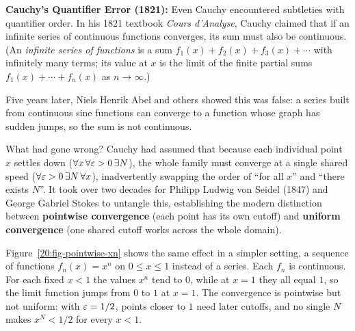 \begin{trapbox}
\textbf{Cauchy's Quantifier Error (1821):}
Even Cauchy encountered subtleties with quantifier order. In his 1821 textbook \emph{Cours d'Analyse}, Cauchy claimed that if an infinite series of continuous functions converges, its sum must also be continuous. (An \emph{infinite series of functions} is a sum $f_1(x) + f_2(x) + f_3(x) + \cdots$ with infinitely many terms; its value at $x$ is the limit of the finite partial sums $f_1(x) + \cdots + f_n(x)$ as $n \to \infty$.)

Five years later, Niels Henrik Abel and others showed this was false: a series built from continuous sine functions can converge to a function whose graph has sudden jumps, so the sum is not continuous.

What had gone wrong? Cauchy had assumed that because each individual point $x$ settles down ($\forall x \, \forall \varepsilon > 0 \, \exists N$), the whole family must converge at a single shared speed ($\forall \varepsilon > 0 \, \exists N \, \forall x$), inadvertently swapping the order of ``for all $x$'' and ``there exists $N$''. It took over two decades for Philipp Ludwig von Seidel (1847) and George Gabriel Stokes to untangle this, establishing the modern distinction between \textbf{pointwise convergence} (each point has its own cutoff) and \textbf{uniform convergence} (one shared cutoff works across the whole domain).

Figure~\ref{20:fig-pointwise-xn} shows the same effect in a simpler setting, a sequence of functions $f_n(x) = x^n$ on $0 \le x \le 1$ instead of a series. Each $f_n$ is continuous. For each fixed $x < 1$ the values $x^n$ tend to $0$, while at $x = 1$ they all equal $1$, so the limit function jumps from $0$ to $1$ at $x = 1$. The convergence is pointwise but not uniform: with $\varepsilon = 1/2$, points closer to $1$ need later cutoffs, and no single $N$ makes $x^N < 1/2$ for every $x < 1$.
\end{trapbox}

